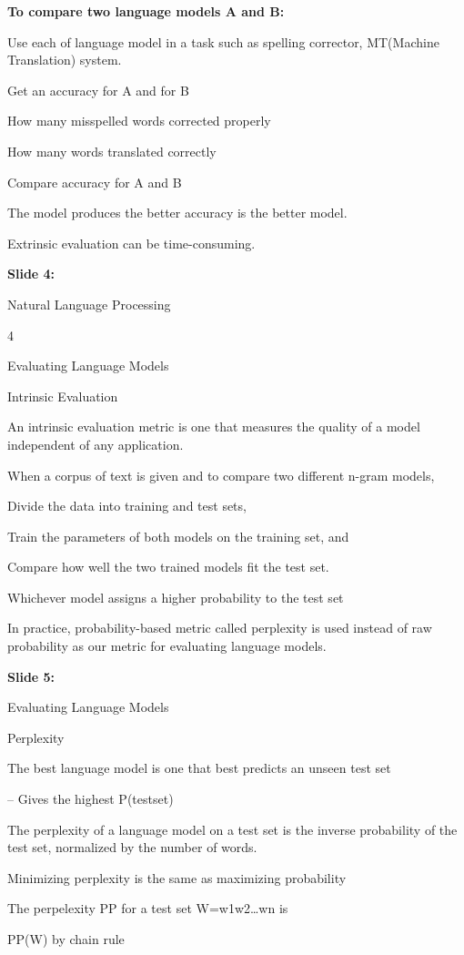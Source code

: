 \documentclass[11pt,a4paper]{article}
\begin{document}
\textbf{To compare two language models A and B:} 

Use each of language model in a task such as spelling corrector, MT(Machine Translation) system.

Get an accuracy for A and for B

How many misspelled words corrected properly

How many words translated correctly

Compare accuracy for A and B

The model produces the better accuracy is the better model.

Extrinsic evaluation can be time-consuming.

\textbf{Slide 4:}

Natural Language Processing

4

Evaluating Language Models

Intrinsic Evaluation

An intrinsic evaluation metric is one that measures the quality of a model  independent of any application.

When a corpus of text is given and to compare two different n-gram models,

Divide the data into training and test sets,

Train the parameters of both models on the training set, and

Compare how well the two trained models fit the test set.

Whichever model assigns a higher probability to the test set

In practice, probability-based metric called perplexity is used instead of raw  probability as our metric for evaluating language models.

\textbf{Slide 5:}

Evaluating Language Models

Perplexity

The best language model is one that best predicts an unseen test set

–	Gives the highest P(testset)

The perplexity of a language model on a test set is the inverse probability of the test  set, normalized by the number of words.

Minimizing perplexity is the same as maximizing probability

The perpelexity PP for a test set W=w1w2…wn is

PP(W)	by chain rule
\end{document}
